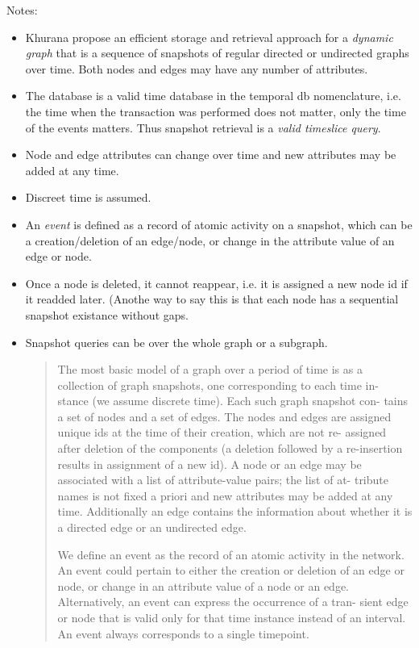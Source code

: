 Notes:
\begin{itemize}

\item Khurana propose an efficient storage and retrieval approach for a {\em dynamic graph} that is a sequence of snapshots of regular directed or undirected graphs over time. Both nodes and edges may have any number of attributes.
\item The database is a valid time database in the temporal db nomenclature, i.e. the time when the transaction was performed does not matter, only the time of the events matters. Thus snapshot retrieval is a {\em valid timeslice query}.
\item Node and edge attributes can change over time and new attributes may be added at any time.
\item Discreet time is assumed.
\item An {\em event} is defined as a record of atomic activity on a snapshot, which can be a creation/deletion of an edge/node, or change in the attribute value of an edge or node.
\item Once a node is deleted, it cannot reappear, i.e. it is assigned a new node id if it readded later. (Anothe way to say this is that each node has a sequential snapshot existance without gaps.
\item Snapshot queries can be over the whole graph or a subgraph.

\begin{quote}

The most basic model of a graph over a period of time is as a collection of graph snapshots, one corresponding to each time in- stance (we assume discrete time). Each such graph snapshot con- tains a set of nodes and a set of edges. The nodes and edges are assigned unique ids at the time of their creation, which are not re- assigned after deletion of the components (a deletion followed by a re-insertion results in assignment of a new id). A node or an edge may be associated with a list of attribute-value pairs; the list of at- tribute names is not fixed a priori and new attributes may be added at any time. Additionally an edge contains the information about whether it is a directed edge or an undirected edge.

We define an event as the record of an atomic activity in the network. An event could pertain to either the creation or deletion of an edge or node, or change in an attribute value of a node or an edge. Alternatively, an event can express the occurrence of a tran- sient edge or node that is valid only for that time instance instead of an interval. An event always corresponds to a single timepoint.


\end{quote}
\end{itemize}
